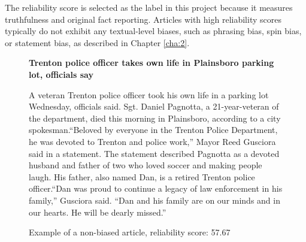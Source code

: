 The reliability score is selected as the label in this project because it measures truthfulness and original fact reporting. Articles with high reliability scores typically do not exhibit any textual-level biases, such as phrasing bias, spin bias, or statement bias, as described in Chapter \ref{cha:2}.

\begin{figure}[htbp]
    \centering
    \begin{minipage}{1\linewidth}
        \begin{center}
            \small{\textbf{Trenton police officer takes own life in Plainsboro parking lot, officials say}}
        \end{center}
        \scriptsize{
            A veteran Trenton police officer took his own life in a parking lot Wednesday, officials said. Sgt. Daniel Pagnotta, a 21-year-veteran of the department, died this morning in Plainsboro, according to a city spokesman.“Beloved by everyone in the Trenton Police Department, he was devoted to Trenton and police work,” Mayor Reed Gusciora said in a statement. The statement described Pagnotta as a devoted husband and father of two who loved soccer and making people laugh. His father, also named Dan, is a retired Trenton police officer.“Dan was proud to continue a legacy of law enforcement in his family,” Gusciora said. “Dan and his family are on our minds and in our hearts. He will be dearly missed.”}
    \end{minipage}
    \caption{Example of a non-biased article, reliability score: 57.67}
    \label{fig:example-nonbiased-article-1}
\end{figure}

